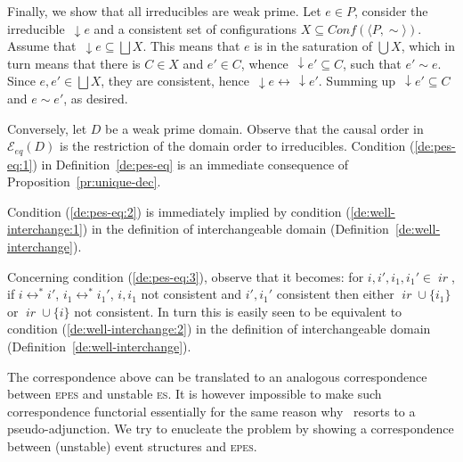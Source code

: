 \documentclass[conference]{IEEEtran}
\renewenvironment{proof}{\begin{IEEEproof}}{\end{IEEEproof}}
\newcommand{\wi}{{interchangeable}}
\newcommand{\ir}[1]{\ensuremath{\mathop{\mathit{ir}({#1})}}}
\newcommand{\esabbr}{\textsc{es}}
\newcommand{\eseqabbr}{\textsc{epes}}
\newcommand{\pred}[1]{\ensuremath{\mathit{p}({#1})}}
\newcommand{\zeveq}[0]{\ensuremath{\mathcal{E}_{eq}}}
\newcommand{\eveq}[1]{\ensuremath{\zeveq({#1})}}
\newcommand{\conf}[1]{\ensuremath{\mathit{Conf}({#1})}}
\newcommand{\causes}[1]{\ensuremath{\,\downarrow\!\!{#1}}}
\begin{document}
\begin{proof}
    Finally, we show that all irreducibles are weak prime. Let $e \in P$, consider the irreducible $\causes{e}$ and a consistent set of configurations $X \subseteq \conf{\langle P, \sim \rangle}$. Assume that $\causes{e} \subseteq \bigsqcup X$. This means that $e$ is in the saturation of $\bigcup X$, which in turn means that there is $C \in X$ and $e' \in C$, whence $\causes{e'} \subseteq C$, such that $e' \sim e$. Since $e, e' \in  \bigsqcup X$, they are consistent, hence $\causes{e} \leftrightarrow \causes{e'}$. Summing up $\causes{e'} \subseteq C$ and $e \sim e'$, as desired.
  

  Conversely, let $D$ be a weak  prime domain. Observe that the causal
  order  in $\eveq{D}$  is  the  restriction of  the  domain order  to
  irreducibles. Condition (\ref{de:pes-eq:1}) in Definition~\ref{de:pes-eq} is an immediate consequence of Proposition~\ref{pr:unique-dec}.


    Condition (\ref{de:pes-eq:2}) is immediately implied by condition
    (\ref{de:well-interchange:1}) in the definition of {\wi} domain
    (Definition~\ref{de:well-interchange}).
    
    Concerning condition (\ref{de:pes-eq:3}), observe that it becomes:
    for $i, i', i_1, i_1' \in \ir{D}$, if $i \leftrightarrow^* i'$,
    $i_1 \leftrightarrow^* i_1'$, $i, i_1$ not consistent and
    $i', i_1'$ consistent then either $\ir{\pred{i}} \cup \{i_1\}$ or
    $\ir{\pred{i_1}} \cup \{i\}$ not consistent. In turn this is
    easily seen to be equivalent to condition
    (\ref{de:well-interchange:2}) in the definition of {\wi} domain
    (Definition~\ref{de:well-interchange}).
\end{proof}


The correspondence above can be translated to an analogous
correspondence between {\eseqabbr} and unstable {\esabbr}. It is
however impossible to make such correspondence functorial essentially for
the same reason why~\cite{win2017,VismeW19} resorts to a pseudo-adjunction. 
We try to enucleate the problem by showing a correspondence between
(unstable) event structures and {\eseqabbr}.
\end{document}
